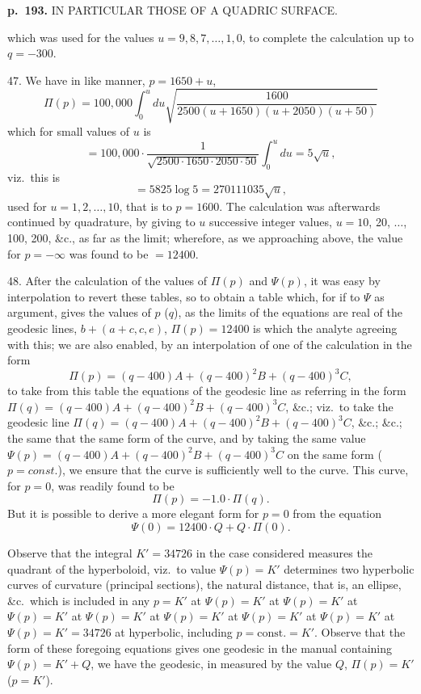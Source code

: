 \documentclass[11pt,a4paper]{article}
\begin{document}
\clearpage

\noindent
\textbf{p.~193.}  IN PARTICULAR THOSE OF A QUADRIC SURFACE.

which was used for the values $u = 9, 8, 7, \ldots, 1, 0$, to complete the calculation up to $q = -300$.

47. We have in like manner, $p = 1650 + u$,
\[
\Pi(p) = 100,000 \int_0^{u} du \sqrt{\frac{1600}{2500(u + 1650)(u + 2050)(u + 50)}}
\]
which for small values of $u$ is
\[
= 100,000 \cdot \frac{1}{\sqrt{2500 \cdot 1650 \cdot 2050 \cdot 50}} \int_0^u du = 5\sqrt{u},
\]
viz.\ this is
\[
= 5825 \log 5 = 270111035\sqrt{u},
\]
used for $u = 1, 2, \ldots, 10$, that is to $p = 1600$. The calculation was afterwards continued by quadrature, by giving to $u$ successive integer values, $u = 10$, 20, $\ldots$, 100, 200, \&c., as far as the limit; wherefore, as we approaching above, the value for $p = -\infty$ was found to be $= 12400$.

48. After the calculation of the values of $\Pi(p)$ and $\Psi(p)$, it was easy by interpolation to revert these tables, so to obtain a table which, for if to $\Psi$ as argument, gives the values of $p$ ($q$), as the limits of the equations are real of the geodesic lines, $b + (a + c, c, e)$, $\Pi(p) = 12400$ is which the analyte agreeing with this; we are also enabled, by an interpolation of one of the calculation in the form
\[
\Pi(p) = (q - 400)A + (q - 400)^2B + (q - 400)^3C,
\]
to take from this table the equations of the geodesic line as referring in the form $\Pi(q) = (q - 400)A + (q - 400)^2B + (q - 400)^3C$, \&c.; viz.\ to take the geodesic line $\Pi(q) = (q - 400)A + (q - 400)^2B + (q - 400)^3C$, \&c.; \&c.; the same that the same form of the curve, and by taking the same value $\Psi(p) = (q - 400)A + (q - 400)^2B + (q - 400)^3C$ on the same form ($p = const.$), we ensure that the curve is sufficiently well to the curve.  This curve, for $p = 0$, was readily found to be
\[
\Pi(p) = -1.0 \cdot \Pi(q).
\]
But it is possible to derive a more elegant form for $p = 0$ from the equation
\[
\Psi(0) = 12400 \cdot Q + Q \cdot \Pi(0).
\]

Observe that the integral $K' = 34726$ in the case considered measures the quadrant of the hyperboloid, viz.\ to value $\Psi(p) = K'$ determines two hyperbolic curves of curvature (principal sections), the natural distance, that is, an ellipse, \&c.\ which is included in any $p = K'$ at $\Psi(p) = K'$ at $\Psi(p) = K'$ at $\Psi(p) = K'$ at $\Psi(p) = K'$ at $\Psi(p) = K'$ at $\Psi(p) = K'$ at $\Psi(p) = K'$ at $\Psi(p) = K' = 34726$ at hyperbolic, including $p = \mathrm{const.} = K'$.  Observe that the form of these foregoing equations gives one geodesic in the manual containing $\Psi(p) = K' + Q$, we have the geodesic, in measured by the value $Q$, $\Pi(p) = K'$ ($p = K'$).
\end{document}
